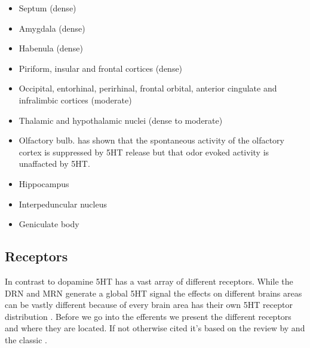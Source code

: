 \documentclass[12pt,a4paper]{article}
\begin{document}
\begin{itemize}
  \item Septum (dense)
  \item Amygdala (dense)
  \item Habenula (dense)
  \item Piriform, insular and frontal cortices (dense)
  \item Occipital, entorhinal, perirhinal, frontal orbital, anterior
    cingulate and infralimbic cortices (moderate)
  \item Thalamic and hypothalamic nuclei (dense to moderate)
  \item Olfactory bulb. \citep{Lottem2016} has shown that the
    spontaneous activity of the olfactory cortex is suppressed by 5HT
    release but that odor evoked activity is unaffacted by 5HT.
  \item Hippocampus
  \item Interpeduncular nucleus
  \item Geniculate body
\end{itemize}

\subsection{Receptors}
In contrast to dopamine 5HT has a vast array of different
receptors. While the DRN and MRN generate a global 5HT signal the
effects on different brains areas can be vastly different because of
every brain area has their own 5HT receptor distribution
\citep{Palacios1990} \citep{Carhart-Harris2017}. Before we go into the
efferents we present the different receptors and where they are
located. If not otherwise cited it's based on the review by
\citep{Mengod2010} and the classic \citep{Palacios1990}.
\end{document}

